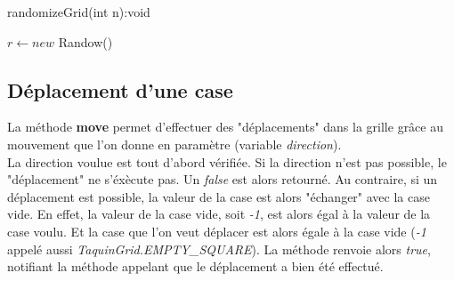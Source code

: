 			\begin{algorithm}[H]
				\caption{randomizeGrid(int n):void}
				$r\leftarrow new$ Randow()

			\end{algorithm}

		\subsection{Déplacement d'une case}
			La méthode \textbf{move} permet d'effectuer des "déplacements" dans la grille grâce au mouvement que l'on donne en paramètre (variable \textit{direction}).\\
			La direction voulue est tout d'abord vérifiée. Si la direction n'est pas possible, le "déplacement" ne s'éxècute pas. Un \textit{false} est alors retourné. Au contraire, si un déplacement est possible, la valeur de la case est alors "échanger" avec la case vide. En effet, la valeur de la case vide, soit \textit{-1}, est alors égal à la valeur de la case voulu. Et la case que l'on veut déplacer est alors égale à la case vide (\textit{-1} appelé aussi \textit{TaquinGrid.EMPTY\_SQUARE}). La méthode renvoie alors \textit{true}, notifiant la méthode appelant que le déplacement a bien été effectué.\\

